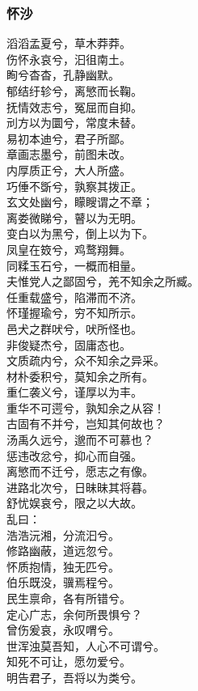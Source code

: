 \documentclass[]{article}
\begin{document}
\hypertarget{header-n100}{%
\subsubsection{怀沙}\label{header-n100}}

滔滔孟夏兮，草木莽莽。\\
伤怀永哀兮，汩徂南土。\\
眴兮杳杳，孔静幽默。\\
郁结纡轸兮，离慜而长鞠。\\
抚情效志兮，冤屈而自抑。\\
刓方以为圜兮，常度未替。\\
易初本迪兮，君子所鄙。\\
章画志墨兮，前图未改。\\
内厚质正兮，大人所盛。\\
巧倕不斲兮，孰察其拨正。\\
玄文处幽兮，矇瞍谓之不章；\\
离娄微睇兮，瞽以为无明。\\
变白以为黑兮，倒上以为下。\\
凤皇在笯兮，鸡鹜翔舞。\\
同糅玉石兮，一概而相量。\\
夫惟党人之鄙固兮，羌不知余之所臧。\\
任重载盛兮，陷滞而不济。\\
怀瑾握瑜兮，穷不知所示。\\
邑犬之群吠兮，吠所怪也。\\
非俊疑杰兮，固庸态也。\\
文质疏内兮，众不知余之异采。\\
材朴委积兮，莫知余之所有。\\
重仁袭义兮，谨厚以为丰。\\
重华不可遌兮，孰知余之从容！\\
古固有不并兮，岂知其何故也？\\
汤禹久远兮，邈而不可慕也？\\
惩违改忿兮，抑心而自强。\\
离慜而不迁兮，愿志之有像。\\
进路北次兮，日昧昧其将暮。\\
舒忧娱哀兮，限之以大故。\\
乱曰：\\
浩浩沅湘，分流汩兮。\\
修路幽蔽，道远忽兮。\\
怀质抱情，独无匹兮。\\
伯乐既没，骥焉程兮。\\
民生禀命，各有所错兮。\\
定心广志，余何所畏惧兮？\\
曾伤爰哀，永叹喟兮。\\
世浑浊莫吾知，人心不可谓兮。\\
知死不可让，愿勿爱兮。\\
明告君子，吾将以为类兮。
\end{document}
